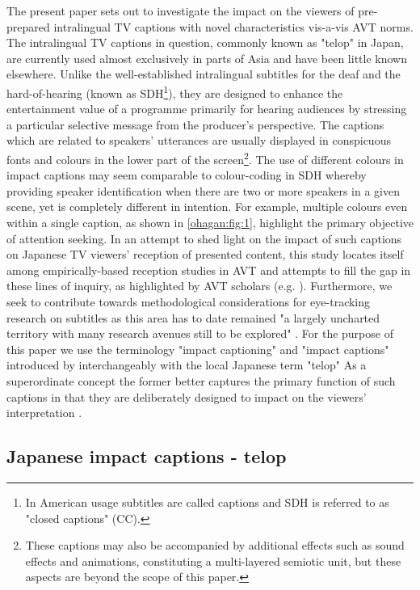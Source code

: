 \documentclass[output=paper]{langsci/langscibook}
\begin{document}
The present paper sets out to investigate the impact on the viewers of pre-prepared intralingual TV captions with novel characteristics vis-a-vis AVT norms. The intralingual TV captions in question, commonly known as "telop" in Japan, are currently used almost exclusively in parts of Asia and have been little known elsewhere.  Unlike the well-established intralingual subtitles for the deaf and the hard-of-hearing (known as SDH\footnote{In American usage subtitles are called captions and SDH is referred to as "closed captions" (CC).}), they are designed to enhance the entertainment value of a programme primarily for hearing audiences by stressing a particular selective message from the producer's perspective. The captions which are related to speakers' utterances are usually displayed in conspicuous fonts and colours in the lower part of the screen\footnote{ These captions may also be accompanied by additional effects such as sound effects and animations, constituting a multi-layered semiotic unit, but these aspects are beyond the scope of this paper.}. The use of different colours in impact captions may seem comparable to colour-coding in SDH whereby providing speaker identification when there are two or more speakers in a given scene, yet is completely different in intention. For example, multiple colours even within a single caption, as shown in \ref{ohagan:fig:1}, highlight the primary objective of attention seeking. In an attempt to shed light on the impact of such captions on Japanese TV viewers' reception of presented content, this study locates itself among empirically-based reception studies in AVT and attempts to fill the gap in these lines of inquiry, as highlighted by AVT scholars (e.g. \citet{gambier2013}). Furthermore, we seek to contribute towards methodological considerations for eye-tracking research on subtitles as this area has to date remained "a largely uncharted territory with many research avenues still to be explored" \citep[n.p.]{Kruger2015}.  For the purpose of this paper we use the terminology "impact captioning" and "impact captions" introduced by \citet{Park2009} interchangeably with the local Japanese term "telop" As a superordinate concept the former better captures the primary function of such captions in that they are deliberately designed to impact on the viewers' interpretation \citep{Shiota2003}.

\subsection{Japanese impact captions - telop}
\end{document}
